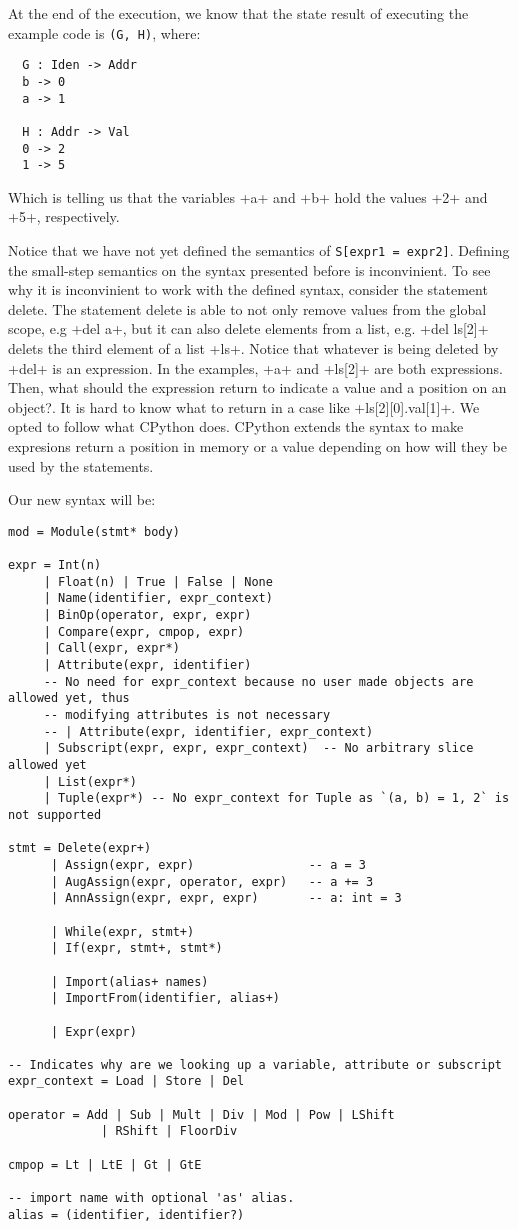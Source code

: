 At the end of the execution, we know that the state result of executing the example code
is \verb|(G, H)|, where:

\begin{verbatim}
  G : Iden -> Addr
  b -> 0
  a -> 1

  H : Addr -> Val
  0 -> 2
  1 -> 5
\end{verbatim}

Which is telling us that the variables \pycode+a+ and \pycode+b+ hold the values
\pycode+2+ and \pycode+5+, respectively.

Notice that we have not yet defined the semantics of \verb+S[expr1 = expr2]+.
Defining the small-step semantics on the syntax presented before is inconvinient. To see
why it is inconvinient to work with the defined syntax, consider the statement delete. The
statement delete is able to not only remove values from the global scope, e.g \pycode+del
a+, but it can also delete elements from a list, e.g. \pycode+del ls[2]+ delets the third
element of a list \pycode+ls+. Notice that whatever is being deleted by \pycode+del+ is an
expression. In the examples, \pycode+a+ and \pycode+ls[2]+ are both expressions. Then,
what should the expression return to indicate a value and a position on an object?. It is
hard to know what to return in a case like \pycode+ls[2][0].val[1]+. We opted to follow
what CPython does. CPython extends the syntax to make expresions return a position in memory
or a value depending on how will they be used by the statements.

Our new syntax will be:

\begin{verbatim}
mod = Module(stmt* body)

expr = Int(n)
     | Float(n) | True | False | None
     | Name(identifier, expr_context)
     | BinOp(operator, expr, expr)
     | Compare(expr, cmpop, expr)
     | Call(expr, expr*)
     | Attribute(expr, identifier)
     -- No need for expr_context because no user made objects are allowed yet, thus
     -- modifying attributes is not necessary
     -- | Attribute(expr, identifier, expr_context)
     | Subscript(expr, expr, expr_context)  -- No arbitrary slice allowed yet
     | List(expr*)
     | Tuple(expr*) -- No expr_context for Tuple as `(a, b) = 1, 2` is not supported

stmt = Delete(expr+)
      | Assign(expr, expr)                -- a = 3
      | AugAssign(expr, operator, expr)   -- a += 3
      | AnnAssign(expr, expr, expr)       -- a: int = 3

      | While(expr, stmt+)
      | If(expr, stmt+, stmt*)

      | Import(alias+ names)
      | ImportFrom(identifier, alias+)

      | Expr(expr)

-- Indicates why are we looking up a variable, attribute or subscript
expr_context = Load | Store | Del

operator = Add | Sub | Mult | Div | Mod | Pow | LShift
             | RShift | FloorDiv

cmpop = Lt | LtE | Gt | GtE

-- import name with optional 'as' alias.
alias = (identifier, identifier?)
\end{verbatim}

